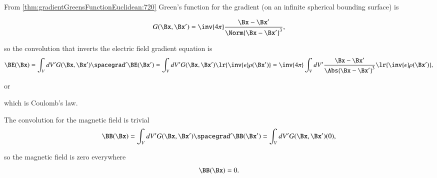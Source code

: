 %
%
From \cref{thm:gradientGreensFunctionEuclidean:720}
 Green's function for the gradient (on an infinite spherical bounding surface) is

\begin{dmath}\label{eqn:electrostatics_invertingGradient:260}
G(\Bx, \Bx') = \inv{4 \pi} \frac{\Bx - \Bx'}{\Norm{\Bx - \Bx'}^3},
\end{dmath}

so the convolution that inverts the electric field gradient equation is
\begin{dmath}\label{eqn:electrostatics_invertingGradient:621}
\BE(\Bx)
= \int_V dV' G(\Bx, \Bx') \spacegrad' \BE(\Bx')
= \int_V dV' G(\Bx, \Bx') \lr{ \inv{\epsilon}\rho(\Bx') }
= \inv{4\pi} \int_V dV' \frac{\Bx - \Bx'}{ \Abs{\Bx - \Bx'}^3 } \lr{ \inv{\epsilon}\rho(\Bx') },
\end{dmath}

or

which is Coulomb's law.

The convolution for the magnetic field is trivial
\begin{dmath}\label{eqn:electrostatics_invertingGradient:641}
\BB(\Bx)
= \int_V dV' G(\Bx, \Bx') \spacegrad' \BB(\Bx')
= \int_V dV' G(\Bx, \Bx') (0),
\end{dmath}

so the magnetic field is zero everywhere
\begin{dmath}\label{eqn:electrostatics_invertingGradient:320}
\BB(\Bx) = 0.
\end{dmath}


